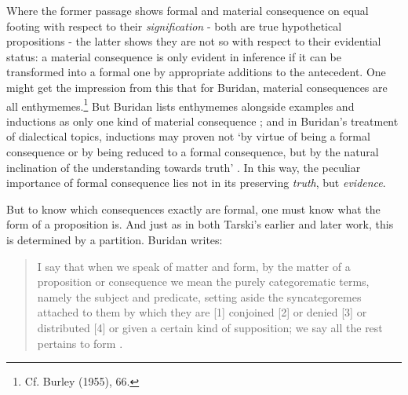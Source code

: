 \documentclass[]{article}
\begin{document}
Where the former passage shows formal and material consequence on equal footing with respect to their \textit{signification} - both are true hypothetical propositions - the latter shows they are not so with respect to their evidential status: a material consequence is only evident in inference if it can be transformed into a formal one by appropriate additions to the antecedent. One might get the impression from this that for Buridan, material consequences are all enthymemes.\footnote{Cf. Burley (1955), 66.} But Buridan lists enthymemes alongside examples and inductions as only one kind of material consequence \cite[TC III. 1, 113]{Buridan2015}; and in Buridan's treatment of dialectical topics, inductions may proven not `by virtue of being a formal consequence or by being reduced to a formal consequence, but by the natural inclination of the understanding towards truth' \cite[SD 6.1.5]{BuridanLoci}. In this way, the peculiar importance of formal consequence lies not in its preserving \textit{truth}, but \textit{evidence}.

But to know which consequences exactly are formal, one must know what the form of a proposition is. And just as in both Tarski's earlier and later work, this is determined by a partition. Buridan writes:

\begin{quote}
I say that when we speak of matter and form, by the matter of a proposition or consequence we mean the purely categorematic terms, namely the subject and predicate, setting aside the syncategoremes attached to them by which they are [1] conjoined [2] or denied [3] or distributed [4] or given a certain kind of supposition; we say all the rest pertains to form \cite[TC I. 7, 74]{Buridan2015}.
\end{quote}
\end{document}
